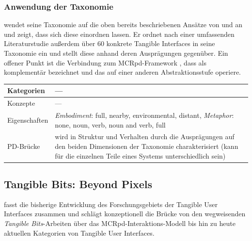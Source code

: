 \subsubsection{Anwendung der Taxonomie}
\citeauthor{Fishkin04} wendet seine Taxonomie auf die oben bereits beschriebenen Ansätze von \citep{Holmquist99} und \citep{Underkoffler99} an und zeigt, dass sich diese einordnen lassen. Er ordnet nach einer umfassenden Literaturstudie außerdem über 60 konkrete Tangible Interfaces in seine Taxonomie ein und stellt diese anhand deren Ausprägungen gegenüber. Ein offener Punkt ist die Verbindung zum \gls{MCRpd}-Framework \citep{Ullmer00}, dass \citeauthor{Fishkin04} als komplementär bezeichnet und das auf einer anderen Abstraktionsstufe operiere. 
\\[1em]
\begin{tabular}{| p{3cm} | p{10cm} |}
  \hline
  Kategorien & --- \\ \hline
  Konzepte & --- \\ \hline
  Eigenschaften & \emph{Embodiment}: full, nearby, environmental, distant, \emph{Metaphor}: none, noun, verb, noun and verb, full\\ \hline
  PD-Brücke & wird in Struktur und Verhalten durch die Ausprägungen auf den beiden Dimensionen der Taxonomie charakterisiert (kann für die einzelnen Teile eines Systems unterschiedlich sein)  \\ \hline
\end{tabular} 


\subsection{Tangible Bits: Beyond Pixels} %
\label{sub:tangible_bits_beyond_pixels}

\citet{Ishii08} fasst die bisherige Entwicklung des Forschungsgebiets der Tangible User Interfaces zusammen und schlägt konzeptionell die Brücke von den wegweisenden \emph{Tangible Bits}-Arbeiten über das MCRpd-Interaktions-Modell bis hin zu heute aktuellen Kategorien von Tangible User Interfaces.

